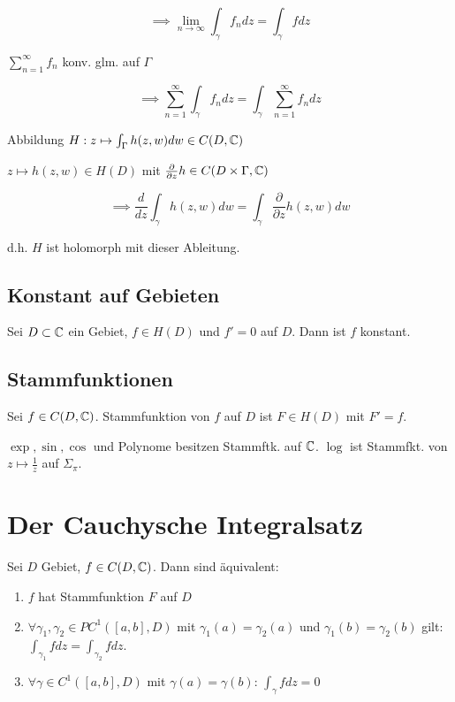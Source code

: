 \vspace*{-2mm}
$$\implies \displaystyle\lim_{n\to\infty} \int_\gamma f_n dz = \int_\gamma f dz$$

$\sum_{n=1}^\infty f_n$ konv. glm. auf $\Gamma$

\vspace*{-2mm}
$$\implies \displaystyle\sum_{n=1}^\infty \int_\gamma f_n dz = \int_\gamma \displaystyle\sum_{n=1}^\infty f_n dz$$

\columnbreak

Abbildung $H : z \mapsto \int_\Gamma h(z,w) dw \in C(D,\mathbb{C})$

$z \mapsto h(z,w) \in H(D)$ mit $\frac{\partial}{\partial z} h \in C(D \times \Gamma, \mathbb{C})$

\vspace*{-2mm}
$$\implies \frac{d}{dz} \int_\gamma h(z,w) dw = \int_\gamma \frac{\partial}{\partial z} h(z,w) dw$$

d.h. $H$ ist holomorph mit dieser Ableitung.

\subsection*{Konstant auf Gebieten}

Sei $D \subset \mathbb{C}$ ein Gebiet, $f \in H(D)$ und $f'=0$ auf $D$. Dann ist $f$ konstant.

\subsection*{Stammfunktionen}

Sei $f \in C(D,\mathbb{C})$. Stammfunktion von $f$ auf $D$ ist $F \in H(D)$ mit $F'=f$.

$\exp, \sin, \cos$ und Polynome besitzen Stammftk. auf $\mathbb{C}$. $\log$ ist Stammfkt. von $z \mapsto \frac{1}{z}$ auf $\Sigma_\pi$.

\section*{Der Cauchysche Integralsatz}

Sei $D$ Gebiet, $f \in C(D,\mathbb{C})$. Dann sind äquivalent:

\begin{enumerate}[label=(\alph*)]
	\item $f$ hat Stammfunktion $F$ auf $D$
	\item $\forall \gamma_1, \gamma_2 \in PC^1([a,b],D)$ mit $\gamma_1(a)=\gamma_2(a)$ und $\gamma_1(b)=\gamma_2(b)$ gilt: $\int_{\gamma_1} f dz = \int_{\gamma_2} f dz$.
	\item $\forall \gamma \in C^1([a,b],D)$ mit $\gamma(a)=\gamma(b)$: $\int_\gamma f dz = 0$
\end{enumerate}

